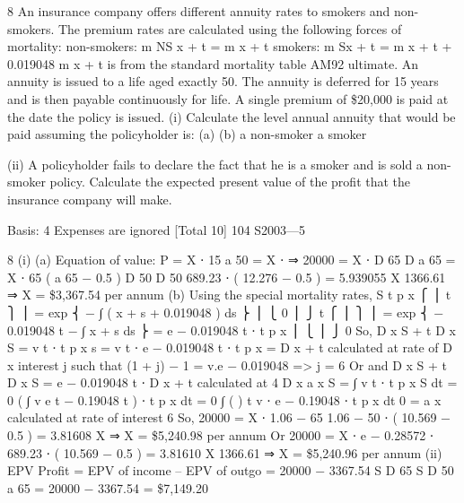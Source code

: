 \documentclass[a4paper,12pt]{article}
\begin{document}
8
An insurance company offers different annuity rates to smokers and non-smokers.
The premium rates are calculated using the following forces of mortality:
non-smokers: m NS
x + t = m x + t
smokers: m Sx + t = m x + t + 0.019048
m x + t is from the standard mortality table AM92 ultimate.
An annuity is issued to a life aged exactly 50. The annuity is deferred for 15 years
and is then payable continuously for life. A single premium of \$20,000 is paid at the
date the policy is issued.
(i)
Calculate the level annual annuity that would be paid assuming the
policyholder is:
(a)
(b)
a non-smoker
a smoker

(ii)
A policyholder fails to declare the fact that he is a smoker and is sold a non-
smoker policy. Calculate the expected present value of the profit that the
insurance company will make.

Basis: 4%
Expenses are ignored
[Total 10]
104 S2003—5


8
(i)
(a)
Equation of value: P = X ⋅ 15 a 50 = X ⋅
⇒ 20000 = X ⋅
D 65
D
a 65 = X ⋅ 65 ( a  65 − 0.5 )
D 50
D 50
689.23
⋅ ( 12.276 − 0.5 ) = 5.939055 X
1366.61
⇒ X = \$3,367.54 per annum
(b)
Using the special mortality rates,
S
t p x
⎧ ⎪ t
⎫ ⎪
= exp ⎨ − ∫ ( \mu x + s + 0.019048 ) ds ⎬
⎪ ⎩ 0
⎪ ⎭
t
⎧ ⎪
⎫ ⎪
= exp ⎨ − 0.019048 t − ∫ \mu x + s ds ⎬ = e − 0.019048 t ⋅ t p x
⎪ ⎩
⎪ ⎭
0
So,
D x S + t
D x S
= v t ⋅ t p x s = v t ⋅ e − 0.019048 t ⋅ t p x =
D x + t
calculated at rate of
D x
interest j such that (1 + j) − 1 = v.e − 0.019048 => j = 6%
Or
and
D x S + t
D x S
= e − 0.019048 t ⋅
D x + t
calculated at 4%
D x%
\infty
a x S
=
∫ v
\infty
t
⋅ t p x S dt
=
0
(
∫ v e
t
− 0.19048 t
)
⋅ t p x dt =
0
\infty
∫ (
)
t
v ⋅ e − 0.19048 ⋅ t p x dt
0
= a x calculated at rate of interest 6%
So, 20000 = X ⋅
1.06 − 65 
1.06 − 50 
⋅ ( 10.569 − 0.5 ) = 3.81608 X
⇒ X = \$5,240.98 per annum
Or 20000 = X ⋅ e − 0.28572 ⋅
689.23
⋅ ( 10.569 − 0.5 ) = 3.81610 X
1366.61
⇒ X = \$5,240.96 per annum
(ii)
EPV Profit = EPV of income – EPV of outgo
= 20000 − 3367.54 \int
S
D 65
S
D 50
\int a 65
= 20000 − 3367.54 
= \$7,149.20
\end{document}
